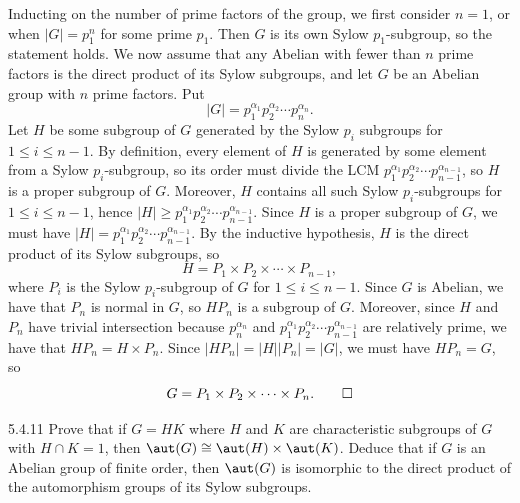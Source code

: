 \begin{sol}[spsol]
    Inducting on the number of prime factors of the group, we first consider $n = 1$, or when $|G| = p_1^n$ for some prime $p_1$.
	Then $G$ is its own Sylow $p_1$-subgroup, so the statement holds.
	We now assume that any Abelian with fewer than $n$ prime factors is the direct product of its Sylow subgroups, and let $G$ be an Abelian group with $n$ prime factors.
	Put
    \[
    	|G| = p_1^{\alpha_1} p_2^{\alpha_2} \cdots p_n^{\alpha_n}.
    \]
    Let $H$ be some subgroup of $G$ generated by the Sylow $p_i$ subgroups for $1 \leq i \leq n - 1$.
	By definition, every element of $H$ is generated by some element from a Sylow $p_i$-subgroup, so its order must divide the LCM $p_1^{\alpha_1} p_2^{\alpha_2} \cdots p_{n-1}^{\alpha_{n-1}}$, so $H$ is a proper subgroup of $G$.
	Moreover, $H$ contains all such Sylow $p_i$-subgroups for $1 \leq i \leq n - 1$, hence $|H| \geq p_1^{\alpha_1} p_2^{\alpha_2} \cdots p_{n-1}^{\alpha_{n-1}}$.
	Since $H$ is a proper subgroup of $G$, we must have $|H| = p_1^{\alpha_1} p_2^{\alpha_2} \cdots p_{n-1}^{\alpha_{n-1}}$.
	By the inductive hypothesis, $H$ is the direct product of its Sylow subgroups, so
    \[
    	H = P_1 \times P_2 \times \cdots \times P_{n-1},
    \]
    where $P_i$ is the Sylow $p_i$-subgroup of $G$ for $1 \leq i \leq n - 1$.
	Since $G$ is Abelian, we have that $P_n$ is normal in $G$, so $HP_n$ is a subgroup of $G$.
	Moreover, since $H$ and $P_n$ have trivial intersection because $p_n^{\alpha_n}$ and $p_1^{\alpha_1} p_2^{\alpha_2} \cdots p_{n-1}^{\alpha_{n-1}}$ are relatively prime, we have that $HP_n = H \times P_n$.
	Since $|HP_n| = |H||P_n| = |G|$, we must have $HP_n = G$, so
    \[
    	G = P_1 \times P_2 \times \cdots \times P_n. \qedhere
    \]
\end{sol}

\begin{spex}{5.4.11}
    Prove that if $G = HK$ where $H$ and $K$ are characteristic subgroups of $G$ with $H \cap K = 1$, then $\aut(G) \cong \aut(H) \times \aut(K)$.
	Deduce that if $G$ is an Abelian group of finite order, then $\aut(G)$ is isomorphic to the direct product of the automorphism groups of its Sylow subgroups.
\end{spex}

